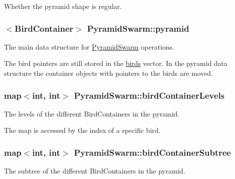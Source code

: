 Whether the pyramid shape is regular. 

\hypertarget{classPyramidSwarm_5d0a3d52d9ae04a4d1542e7977b6464d}{
\subsubsection{$<${\bf BirdContainer}$>$ {\bf PyramidSwarm::pyramid}}}
\label{classPyramidSwarm_5d0a3d52d9ae04a4d1542e7977b6464d}


The main data structure for \hyperlink{classPyramidSwarm}{PyramidSwarm} operations. 

The bird pointers are still stored in the \hyperlink{classSwarm_74191c7a473df093f5537f8d6d5ca1a6}{birds} vector. In the pyramid data structure the container objects with pointers to the birds are moved. \hypertarget{classPyramidSwarm_d61fc84d8f5bdb25d1e008e181f695bb}{
\subsubsection{\setlength{\rightskip}{0pt plus 5cm}map$<$int, int$>$ {\bf PyramidSwarm::birdContainerLevels}}}
\label{classPyramidSwarm_d61fc84d8f5bdb25d1e008e181f695bb}


The levels of the different BirdContainers in the pyramid. 

The map is accessed by the index of a specific bird. \hypertarget{classPyramidSwarm_83d8908955ebd7310ec71678312b3948}{
\subsubsection{\setlength{\rightskip}{0pt plus 5cm}map$<$int, int$>$ {\bf PyramidSwarm::birdContainerSubtree}}}
\label{classPyramidSwarm_83d8908955ebd7310ec71678312b3948}


The subtree of the different BirdContainers in the pyramid. 

